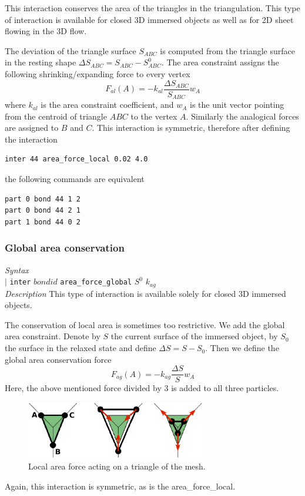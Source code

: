 \documentclass[a4paper]{article}
\begin{document}
This interaction conserves the area of the triangles in the triangulation. This type of interaction is available for closed 3D immersed objects as well as for 2D sheet flowing in the 3D flow.

The deviation of the triangle surface $S_{ABC}$ is computed from the triangle surface in the resting shape $\Delta S_{ABC} = S_{ABC} - S_{ABC}^0$. The area constraint assigns the following  shrinking/expanding force to every vertex 
$$
F_{al}(A) = -k_{al}\frac{\Delta S_{ABC}}{S_{ABC}}w_{A}
$$
where $k_{al}$  is the area constraint coefficient, and $w_{A}$ is the unit vector pointing from the centroid of triangle $ABC$ to the vertex $A$. Similarly the analogical forces are assigned to $B$ and $C$. This interaction is symmetric, therefore after defining the interaction
\begin{verbatim} 
inter 44 area_force_local 0.02 4.0
\end{verbatim}
the following commands are equivalent
\begin{verbatim} 
part 0 bond 44 1 2
part 0 bond 44 2 1
part 1 bond 44 0 2
\end{verbatim}

\subsubsection{Global area conservation}
\textit{Syntax}\\
\hspace*{0.3 cm} $\mid$ \texttt{inter} $bondid$ \texttt{area\_force\_global} $S^0$ $k_{ag}$ \\
\newline
\textit{Description}\newline
This type of interaction is available solely for closed 3D immersed objects.

The conservation of local area is sometimes too restrictive. We add the global area constraint. Denote by $S$ the current surface of the immersed object, by $S_0$ the surface in the relaxed state and define $\Delta S = S - S_0$. Then we define the global area conservation force
$$
F_{ag}(A) = - k_{ag}\frac{\Delta S}{S}w_{A}
$$
Here, the above mentioned force divided by 3 is added to all three particles.

\begin{figure}[h]
   \centering
      \includegraphics[width=0.7\textwidth]{figures/arealocal.eps}
      \caption{Local area force acting on a triangle of the mesh.}
\end{figure}
Again, this interaction is symmetric, as is the area\_{}force\_{}local.
\end{document}

